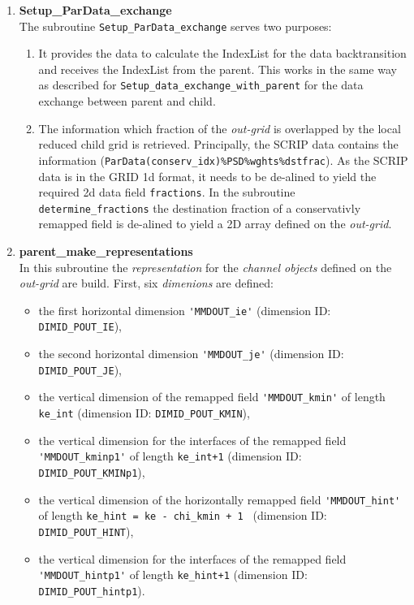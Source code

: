 \documentclass[11pt,twoside]{article}
\begin{document}
\begin{enumerate}
\item {\bf Setup\_ParData\_exchange}\\
The subroutine \verb|Setup_ParData_exchange| serves two purposes:
\begin{enumerate}
\item It provides the data to calculate the IndexList for the data
backtransition and receives the IndexList from the parent. This works in
the same way as described for \verb|Setup_data_exchange_with_parent| for the
data exchange between parent and child.
\item The information which fraction of the {\it out-grid} is overlapped by the
local reduced child grid is retrieved. Principally, the SCRIP data
contains the information
(\verb|ParData(conserv_idx)%PSD%wghts%dstfrac|).
As the SCRIP data is in the GRID 1d format, it needs to be de-alined
to yield the required 2d data field \verb|fractions|.
In the subroutine 
\verb|determine_fractions| the destination fraction of a conservativly
remapped field is de-alined to yield a 2D array defined on the {\it out-grid}.
\end{enumerate}
\item  {\bf parent\_make\_representations}\\
In this subroutine the {\it representation}
for the {\it channel objects} defined on the {\it out-grid} are build. \label{makeprepr}
First, six {\it dimenions} are defined:
\begin{itemize}
\item the first horizontal dimension \verb|'MMDOUT_ie'| 
(dimension ID: \verb|DIMID_POUT_IE|),
\item the second horizontal dimension \verb|'MMDOUT_je'| 
(dimension ID: \verb|DIMID_POUT_JE|),
\item the vertical dimension of the remapped field \verb|'MMDOUT_kmin'| of
length \verb|ke_int| (dimension ID: \verb|DIMID_POUT_KMIN|),
\item the vertical dimension for the interfaces of the remapped
field \verb|'MMDOUT_kminp1'| of 
length \verb|ke_int+1| (dimension ID: \verb|DIMID_POUT_KMINp1|),
\item the vertical dimension of the horizontally remapped
field \verb|'MMDOUT_hint'| of
length \verb|ke_hint = ke - chi_kmin + 1 | (dimension
ID: \verb|DIMID_POUT_HINT|),
\item the vertical dimension for the interfaces of the remapped
field \verb|'MMDOUT_hintp1'| of 
length \verb|ke_hint+1| (dimension ID: \verb|DIMID_POUT_hintp1|).
\end{itemize}

\end{enumerate}
\end{document}
